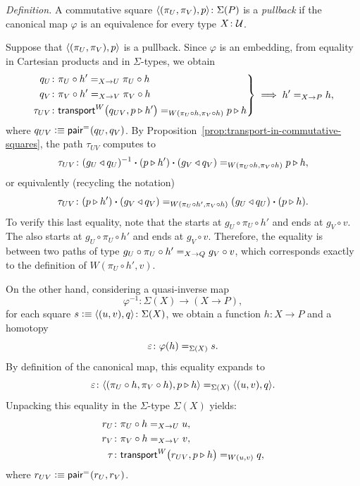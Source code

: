 \begin{solution}
    \textsl{Definition.} A commutative square $\dep{(\pi_U,\pi_V),p}\colon \Sigma(P)$ is a \textsl{pullback} if the canonical map $\varphi$ is an equivalence for every type $X\colon\univ$.

    Suppose that $\langle(\pi_U,\pi_V),p\rangle$ is a pullback. Since $\varphi$ is an embedding, from equality in Cartesian products and in $\Sigma$-types, we obtain
    \begin{equation*}
        \left.\begin{aligned}
            q_U&\colon\pi_U\circ h'\eq{X\to U}\pi_U\circ h\\
            q_V&\colon\pi_V\circ h'\eq{X\to V}\pi_V\circ h\\
            \tau_{UV}&\colon\fun{transport}^W
                \big(
                    q_{UV},
                    p\rwct h'
                \big)
                \eq{W(\pi_U\circ h,\pi_V\circ h)}p\rwct h
        \end{aligned}\right\}
        \implies h'\eq{X\to P}h,
    \end{equation*}
    where $q_{UV}\mathrel{\vcentcolon}\equiv\mathsf{pair}^{\mathrel{=_{}}}(q_U,q_V)$. By Proposition~\ref{prop:transport-in-commutative-squares}, the path $\tau_{UV}$ computes to
    \[
        \tau_{UV}\colon
            (g_U\lwct q_U)^{-1}
            \ct(p\rwct h')
            \ct (g_V \lwct q_V)
            \eq{W(\pi_U \circ h, \pi_V \circ h)}p\rwct h,
    \]
    or equivalently (recycling the notation)
    \[
        \tau_{UV}\colon
            (p\rwct h')\ct(g_V\lwct q_V)
            \eq{W(\pi_U\circ h',\pi_V\circ h)}
            (g_U\lwct q_U)\ct(p\rwct h).
    \]
    To verify this last equality, note that the \lhs starts at $g_U\circ\pi_U\circ h'$ and ends at $g_V\circ v$. The \rhs also starts at $g_U\circ\pi_U\circ h'$ and ends at $g_V\circ v$. Therefore, the equality is between two paths of type $g_U\circ\pi_U\circ h'\mathrel{=_{X\to Q}}g_V\circ v$, which corresponds exactly to the definition of $W(\pi_U\circ h',v)$.
    
    On the other hand, considering a quasi-inverse map
    \[
        \varphi^{-1}\colon \Sigma(X)\to(X\to P),
    \]
    for each square $s\defeq\dep{(u,v),q}\colon\Sigma(X)$, we obtain a function $h\colon X\to P$ and a homotopy
    \[
        \varepsilon\colon\varphi(h)\eq{\Sigma(X)}s.
    \]
    By definition of the canonical map, this equality expands to
    \[
        \varepsilon\colon\dep{(\pi_U\circ h,\pi_V\circ h), p\rwct h}
            \eq{\Sigma(X)}
            \dep{(u,v),q}.
    \]
    Unpacking this equality in the $\Sigma$-type $\Sigma(X)$ yields:
    \begin{align*}
        r_U&\colon\pi_U\circ h\eq{X\to U}u,\\
        r_V&\colon\pi_V\circ h\eq{X\to V}v,\\
        \tau&\colon\fun{transport}^W
            \big(
                r_{UV},
                p\rwct h
            \big)
            \eq{W(u,v)}q,
        \end{align*}
    where $r_{UV}\mathrel{\vcentcolon}\equiv\mathsf{pair}^{\mathrel{=_{}}}(r_U,r_V)$.


\end{solution}
